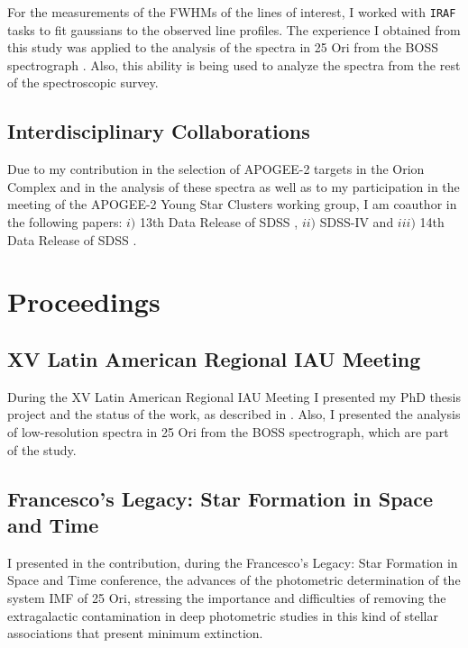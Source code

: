 \documentclass[12pt]{article}
\begin{document}
For the measurements of the FWHMs of the lines of interest, I worked with \texttt{IRAF} tasks to fit gaussians to the observed line profiles. The experience I obtained from this study was applied to the analysis of the spectra in 25 Ori from the BOSS spectrograph \citep{Suarez2017}. Also, this ability is being used to analyze the spectra from the rest of the spectroscopic survey.

\subsection{Interdisciplinary Collaborations}
\label{sec:interdisciplinary_collaborations}
Due to my contribution in the selection of APOGEE-2 targets in the Orion Complex and in the analysis of these spectra as well as to my participation in the meeting of the APOGEE-2 Young Star Clusters working group, I am coauthor in the following papers: $i)$ 13th Data Release of SDSS \citep{SDSS-DR13}, $ii)$ SDSS-IV \citep{Blanton2017} and $iii)$ 14th Data Release of SDSS \citep{SDSS-DR14}.

\section{Proceedings}
\label{sec:proceedings}

\subsection{XV Latin American Regional IAU Meeting}
\label{sec:LARIM2016}
During the XV Latin American Regional IAU Meeting I presented my PhD thesis project and the status of the work, as described in \citet{Suarez2017b}. Also, I presented the analysis of low-resolution spectra in 25 Ori from the BOSS spectrograph, which are part of the \citet{Suarez2017} study.

\subsection{Francesco's Legacy: Star Formation in Space and Time}
\label{sec:SFST2017}
I presented in the \citet{Suarez2017c} contribution, during the Francesco's Legacy: Star Formation in Space and Time conference, the advances of the photometric determination of the system IMF of 25 Ori, stressing the importance and difficulties of removing the extragalactic contamination in deep photometric studies in this kind of stellar associations that present minimum extinction.
\end{document}
